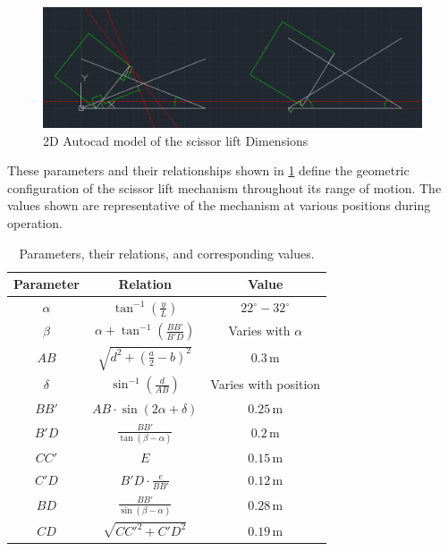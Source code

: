 \documentclass[../../main]{subfiles}
\begin{document}
\begin{figure}
\centering
\includegraphics[width=\textwidth]{img/image037.png}
\caption{2D Autocad model of the scissor lift
Dimensions}
\end{figure}


These parameters and their relationships shown in \cref{tab:parameters} define the geometric
configuration of the scissor lift mechanism throughout its range of
motion. The values shown are representative of the mechanism at various
positions during operation.
\renewcommand{\arraystretch}{1.8} %
\begin{table}[h!]
  \centering
  \begin{tcolorbox}[
    colback=red!5!white,colframe=red!75!black,
    title={\textbf{Component Details and Weights}},
    fonttitle=\bfseries, coltitle=white, width=0.68\linewidth]
  \begin{tabular}{|c|c|c|}
      \hline \rowcolor{red!20}
      \textbf{Parameter} & \textbf{Relation} & \textbf{Value} \\ \hline
      $\alpha$ & $\tan^{-1}\left(\frac{y}{L}\right)$ & $22^\circ - 32^\circ$ \\ \hline
      $\beta$ & $\alpha + \tan^{-1}\left(\frac{BB'}{B'D}\right)$ & Varies with $\alpha$ \\ \hline
      $AB$ & $\sqrt{d^2 + \left(\frac{a}{2} - b\right)^2}$ & $0.3 \, \text{m}$ \\ \hline
      $\delta$ & $\sin^{-1}\left(\frac{d}{AB}\right)$ & Varies with position \\ \hline
      $BB'$ & $AB \cdot \sin(2\alpha + \delta)$ & $0.25 \, \text{m}$ \\ \hline
      $B'D$ & $\frac{BB'}{\tan(\beta - \alpha)}$ & $0.2 \, \text{m}$ \\ \hline
      $CC'$ & $E$ & $0.15 \, \text{m}$ \\ \hline
      $C'D$ & $B'D \cdot \frac{e}{BB'}$ & $0.12 \, \text{m}$ \\ \hline
      $BD$ & $\frac{BB'}{\sin(\beta - \alpha)}$ & $0.28 \, \text{m}$ \\ \hline
      $CD$ & $\sqrt{{CC'}^2 + {C'D}^2}$ & $0.19 \, \text{m}$ \\ \hline
  \end{tabular}
\end{tcolorbox}
  \caption{Parameters, their relations, and corresponding values.}
  \label{tab:parameters}
\end{table}
\renewcommand{\arraystretch}{1.4} %
\end{document}
